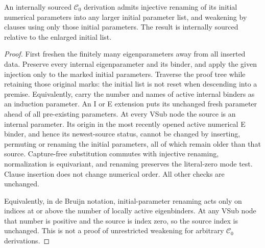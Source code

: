 \begin{lemma}
An internally sourced $\mathcal C_0$ derivation admits injective
renaming of its initial numerical parameters into any larger initial
parameter list, and weakening by clauses using only those initial
parameters. The result is internally sourced relative to the enlarged
initial list.
\end{lemma}
\begin{proof}
First freshen the finitely many eigenparameters away from all inserted
data. Preserve every internal eigenparameter and its binder, and apply
the given injection only to the marked initial parameters. Traverse
the proof tree while retaining those original marks: the initial list
is not reset when descending into a premise. Equivalently, carry
the number and names of active internal binders as an induction
parameter. An I or E extension puts its unchanged fresh parameter ahead of
all pre-existing parameters. At every VSub node the source is an
internal parameter. Its origin in the most recently opened active
numerical E binder, and hence its newest-source status, cannot be
changed by inserting, permuting or renaming the initial parameters,
all of which remain older than that source. Capture-free substitution
commutes with injective renaming, normalization is equivariant, and
renaming preserves the literal-zero mode test. Clause insertion does
not change numerical order. All other checks are unchanged.

Equivalently, in de Bruijn notation, initial-parameter renaming acts
only on indices at or above the number of locally active eigenbinders.
At any VSub node that number is positive and the source is index zero,
so the source index is unchanged. This is not a proof of unrestricted
weakening for arbitrary $\mathcal C_0$ derivations.
\end{proof}

